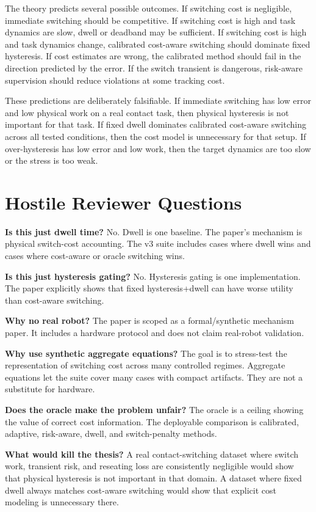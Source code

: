 \documentclass{article}
\begin{document}
The theory predicts several possible outcomes.
If switching cost is negligible, immediate switching should be competitive.
If switching cost is high and task dynamics are slow, dwell or deadband may be sufficient.
If switching cost is high and task dynamics change, calibrated cost-aware switching should dominate fixed hysteresis.
If cost estimates are wrong, the calibrated method should fail in the direction predicted by the error.
If the switch transient is dangerous, risk-aware supervision should reduce violations at some tracking cost.

These predictions are deliberately falsifiable.
If immediate switching has low error and low physical work on a real contact task, then physical hysteresis is not important for that task.
If fixed dwell dominates calibrated cost-aware switching across all tested conditions, then the cost model is unnecessary for that setup.
If over-hysteresis has low error and low work, then the target dynamics are too slow or the stress is too weak.

\section{Hostile Reviewer Questions}

\textbf{Is this just dwell time?}
No. Dwell is one baseline.
The paper's mechanism is physical switch-cost accounting.
The v3 suite includes cases where dwell wins and cases where cost-aware or oracle switching wins.

\textbf{Is this just hysteresis gating?}
No. Hysteresis gating is one implementation.
The paper explicitly shows that fixed hysteresis+dwell can have worse utility than cost-aware switching.

\textbf{Why no real robot?}
The paper is scoped as a formal/synthetic mechanism paper.
It includes a hardware protocol and does not claim real-robot validation.

\textbf{Why use synthetic aggregate equations?}
The goal is to stress-test the representation of switching cost across many controlled regimes.
Aggregate equations let the suite cover many cases with compact artifacts.
They are not a substitute for hardware.

\textbf{Does the oracle make the problem unfair?}
The oracle is a ceiling showing the value of correct cost information.
The deployable comparison is calibrated, adaptive, risk-aware, dwell, and switch-penalty methods.

\textbf{What would kill the thesis?}
A real contact-switching dataset where switch work, transient risk, and reseating loss are consistently negligible would show that physical hysteresis is not important in that domain.
A dataset where fixed dwell always matches cost-aware switching would show that explicit cost modeling is unnecessary there.
\end{document}
